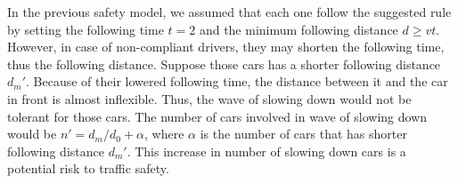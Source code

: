 In the previous safety model, we assumed that each one follow the suggested rule by setting the following time $t = 2$ and the minimum following distance $d \ge vt$. However, in case of non-compliant drivers, they may shorten the following time, thus the following distance. Suppose those cars has a shorter following distance $d_m'$. Because of their lowered following time, the distance between it and the car in front is almost inflexible. Thus, the wave of slowing down would not be tolerant for those cars. The number of cars involved in wave of slowing down would be $n' = d_m/d_0+\alpha$, where $\alpha$ is the number of cars that has shorter following distance $d_m'$. This increase in number of slowing down cars is a potential risk to traffic safety. 